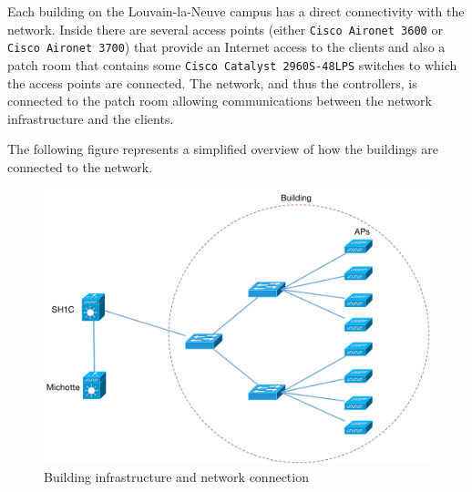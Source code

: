 Each building on the Louvain-la-Neuve campus has a direct connectivity with the network. Inside there are several access points (either \texttt{Cisco Aironet 3600} or \texttt{Cisco Aironet 3700}) that provide an Internet access to the clients and also a patch room that contains some \texttt{Cisco Catalyst 2960S-48LPS} switches to which the access points are connected. The network, and thus the controllers, is connected to the patch room allowing communications between the network infrastructure and the clients.

The following figure represents a simplified overview of how the buildings are connected to the network.

\begin{figure}[H]
	\includegraphics[width=1\linewidth]{Pictures/Chapter2/building.png}
	\caption{Building infrastructure and network connection}
\end{figure}




